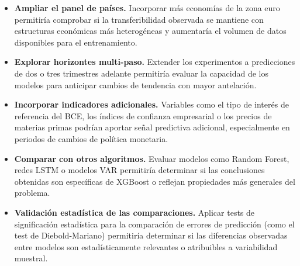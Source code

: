 \begin{itemize}
    \item \textbf{Ampliar el panel de países.} Incorporar más economías de la zona euro
    permitiría comprobar si la transferibilidad observada se mantiene con estructuras
    económicas más heterogéneas y aumentaría el volumen de datos disponibles para el
    entrenamiento.

    \item \textbf{Explorar horizontes multi-paso.} Extender los experimentos a predicciones
    de dos o tres trimestres adelante permitiría evaluar la capacidad de los modelos para
    anticipar cambios de tendencia con mayor antelación.

    \item \textbf{Incorporar indicadores adicionales.} Variables como el tipo de interés
    de referencia del BCE, los índices de confianza empresarial o los precios de materias
    primas podrían aportar señal predictiva adicional, especialmente en periodos de cambios
    de política monetaria.

    \item \textbf{Comparar con otros algoritmos.} Evaluar modelos como Random Forest,
    redes LSTM o modelos VAR permitiría determinar si las conclusiones obtenidas son
    específicas de XGBoost o reflejan propiedades más generales del problema.

    \item \textbf{Validación estadística de las comparaciones.} Aplicar tests de
    significación estadística para la comparación de errores de predicción (como el test
    de Diebold-Mariano) permitiría determinar si las diferencias observadas entre modelos
    son estadísticamente relevantes o atribuibles a variabilidad muestral.
\end{itemize}
